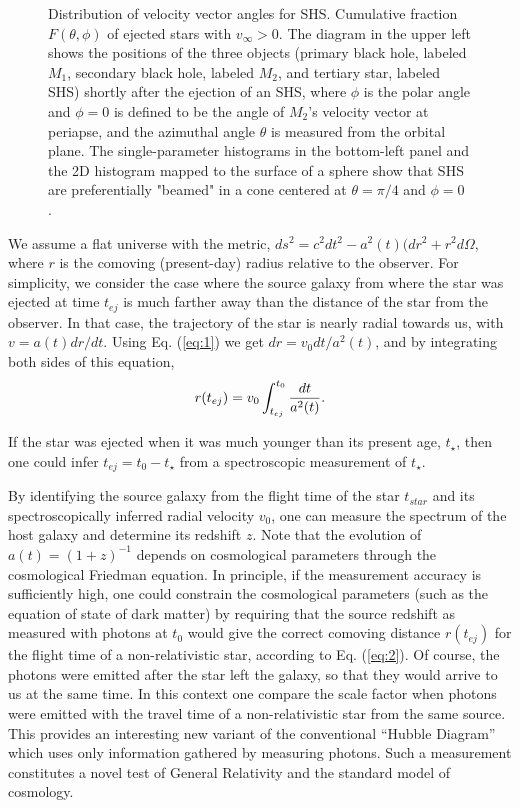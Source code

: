 \documentclass[a4paper,twocolumn]{emulateapj}
\begin{document}
\begin{figure}
\begin{minipage}[b]{0.5\linewidth}
\end{minipage}
\caption{Distribution of velocity vector angles for SHS. Cumulative fraction $F(\theta, \phi)$ of ejected stars with $v_{\infty} > 0$. The diagram in the upper left shows the positions of the three objects (primary black hole, labeled $M_{1}$, secondary black hole, labeled $M_{2}$, and tertiary star, labeled SHS) shortly after the ejection of an SHS, where $\phi$ is the polar angle and $\phi = 0$ is defined to be the angle of $M_{2}$'s velocity vector at periapse, and the azimuthal angle $\theta$ is measured from the orbital plane. The single-parameter histograms in the bottom-left panel and the 2D histogram mapped to the surface of a sphere show that SHS are preferentially "beamed" in a cone centered at $\theta = \pi/4$ and $\phi = 0$ \citep[see][]{Sesana:2007a}.}
\label{fig:ejangles}
\end{figure}

We assume a flat universe with the metric,
$ds^2=c^2dt^2-a^2(t)(dr^2+r^2d\Omega$, where $r$ is the comoving
(present-day) radius relative to the observer. For simplicity, we
consider the case where the source galaxy from where the star was
ejected at time $t_{ej}$ is much farther away than the distance of the
star from the observer. In that case, the trajectory of the star is
nearly radial towards us, with $v=a(t)dr/dt$. Using Eq. (\ref{eq:1})
we get $dr=v_0 dt/a^2(t)$, and by integrating both sides of this
equation,
\begin{equation}
r(t_{ej})=v_0 \int_{t_{ej}}^{t_0} {dt \over a^2(t)} .
\label{eq:2}
\end{equation}

If the star was ejected when it was much younger than its present age,
$t_\star$, then one could infer $t_{ej}=t_0-t_\star$ from a
spectroscopic measurement of $t_\star$. 

By identifying the source galaxy from the flight time of the star
$t_{star}$ and its spectroscopically inferred radial velocity $v_0$,
one can measure the spectrum of the host galaxy and determine its
redshift $z$. Note that the evolution of $a(t)=(1+z)^{-1}$ depends on
cosmological parameters through the cosmological Friedman equation. In
principle, if the measurement accuracy is sufficiently high, one could
constrain the cosmological parameters (such as the equation of state
of dark matter) by requiring that the source redshift as measured with
photons at $t_0$ would give the correct comoving distance $r(t_{ej})$
for the flight time of a non-relativistic star, according to
Eq. (\ref{eq:2}). Of course, the photons were emitted after the star
left the galaxy, so that they would arrive to us at the same time. In
this context one compare the scale factor when photons were emitted
with the travel time of a non-relativistic star from the same
source. This provides an interesting new variant of the conventional
``Hubble Diagram'' which uses only information gathered by measuring
photons. Such a measurement constitutes a novel test of General
Relativity and the standard model of cosmology.
\end{document}
